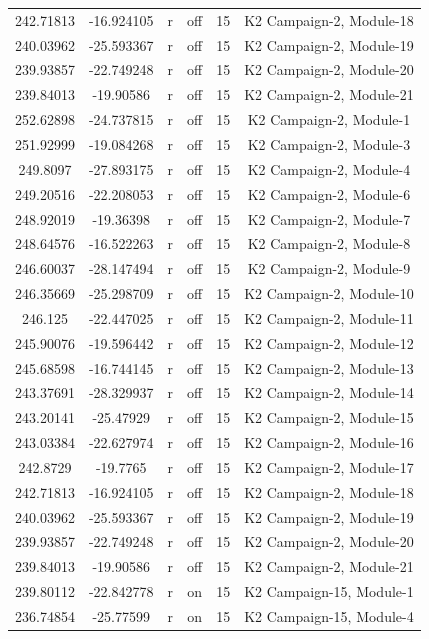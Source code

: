 \documentclass[11pt]{article}
\begin{document}
\begin{center}
\begin{longtable}{|c|c|c|c|c|c|}
242.71813 & -16.924105 & r & off &15 & K2 Campaign-2, Module-18\\
240.03962 & -25.593367 & r & off &15 & K2 Campaign-2, Module-19\\
239.93857 & -22.749248 & r & off &15 & K2 Campaign-2, Module-20\\
239.84013 & -19.90586 & r & off &15 & K2 Campaign-2, Module-21\\
252.62898 & -24.737815 & r & off &15 & K2 Campaign-2, Module-1\\
251.92999 & -19.084268 & r & off &15 & K2 Campaign-2, Module-3\\
249.8097 & -27.893175 & r & off &15 & K2 Campaign-2, Module-4\\
249.20516 & -22.208053 & r & off &15 & K2 Campaign-2, Module-6\\
248.92019 & -19.36398 & r & off &15 & K2 Campaign-2, Module-7\\
248.64576 & -16.522263 & r & off &15 & K2 Campaign-2, Module-8\\
246.60037 & -28.147494 & r & off &15 & K2 Campaign-2, Module-9\\
246.35669 & -25.298709 & r & off &15 & K2 Campaign-2, Module-10\\
246.125 & -22.447025 & r & off &15 & K2 Campaign-2, Module-11\\
245.90076 & -19.596442 & r & off &15 & K2 Campaign-2, Module-12\\
245.68598 & -16.744145 & r & off &15 & K2 Campaign-2, Module-13\\
243.37691 & -28.329937 & r & off &15 & K2 Campaign-2, Module-14\\
243.20141 & -25.47929 & r & off &15 & K2 Campaign-2, Module-15\\
243.03384 & -22.627974 & r & off &15 & K2 Campaign-2, Module-16\\
242.8729 & -19.7765 & r & off &15 & K2 Campaign-2, Module-17\\
242.71813 & -16.924105 & r & off &15 & K2 Campaign-2, Module-18\\
240.03962 & -25.593367 & r & off &15 & K2 Campaign-2, Module-19\\
239.93857 & -22.749248 & r & off &15 & K2 Campaign-2, Module-20\\
239.84013 & -19.90586 & r & off &15 & K2 Campaign-2, Module-21\\
239.80112 & -22.842778 & r & on &15 & K2 Campaign-15, Module-1\\
236.74854 & -25.77599 & r & on &15 & K2 Campaign-15, Module-4\\

\end{longtable}
\end{center}
\end{document}
